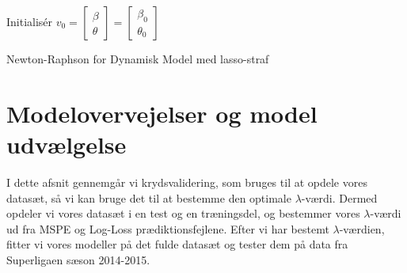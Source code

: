 \documentclass[11pt,a4paper]{article}
\begin{document}
\begin{algorithm}[H]
\SetAlgoLined
{}
 Initialisér $v_0 = \begin{bmatrix}
           \beta \\
           \theta
         \end{bmatrix} =\begin{bmatrix}
           \beta_0 \\
           \theta_0
         \end{bmatrix}\;$\\
\caption{Newton-Raphson for Dynamisk Model med lasso-straf}
\label{alg: DYNLASSO}
\end{algorithm}
\section{Modelovervejelser og model udvælgelse}
I dette afsnit gennemgår vi krydsvalidering, som bruges til at opdele vores datasæt, så vi kan bruge det til at bestemme den optimale $\lambda$-værdi. Dermed opdeler vi vores datasæt i en test og en træningsdel, og bestemmer vores $\lambda$-værdi ud fra MSPE og Log-Loss prædiktionsfejlene. Efter vi har bestemt $\lambda$-værdien, fitter vi vores modeller på det fulde datasæt og tester dem på data fra Superligaen sæson 2014-2015. 
\end{document}
